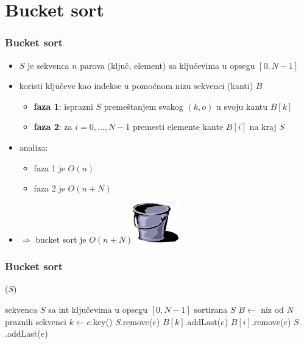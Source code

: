 \documentclass[compress,aspectratio=169]{beamer}
\begin{document}
\section[Bucket sort]{Bucket sort}

\begin{frame}[fragile]
  \frametitle{Bucket sort}
  \begin{itemize}
    \item $S$ je sekvenca $n$ parova (ključ, element) sa ključevima u opsegu $[0, N-1]$
    \item {} koristi ključeve kao indekse u pomoćnom nizu sekvenci (kanti) $B$
    \begin{itemize}
      \item \textbf{faza 1}: isprazni $S$ premeštanjem svakog $(k,o)$ u svoju kantu $B[k]$ 
      \item \textbf{faza 2}: za $i=0,\ldots,N-1$ premesti elemente kante $B[i]$ na kraj $S$ 
    \end{itemize}
    \item analiza:
    \begin{itemize}
      \item faza 1 je $O(n)$ 
      \item faza 2 je $O(n+N)$ 
    \end{itemize}
    \item $\Rightarrow$ bucket sort je $O(n+N)$\hfill\includegraphics[width=2cm]{asp-12-pic31.png}
  \end{itemize}
\end{frame}

\begin{frame}
  \frametitle{Bucket sort}
  ($S$)
  \begin{algorithmic}
    \REQUIRE sekvenca $S$ sa int ključevima u opsegu $[0,N-1]$
    \ENSURE sortirana $S$
    \STATE $B \leftarrow$ niz od $N$ praznih sekvenci
      \STATE $k \leftarrow e$.key()
      \STATE $S$.remove($e$)
      \STATE $B[k]$.addLast($e$) 
    \ENDFOR
        \STATE $B[i]$.remove($e$)
        \STATE $S$.addLast($e$)
      \ENDFOR
    \ENDFOR
  \end{algorithmic}
\end{frame}
\end{document}
